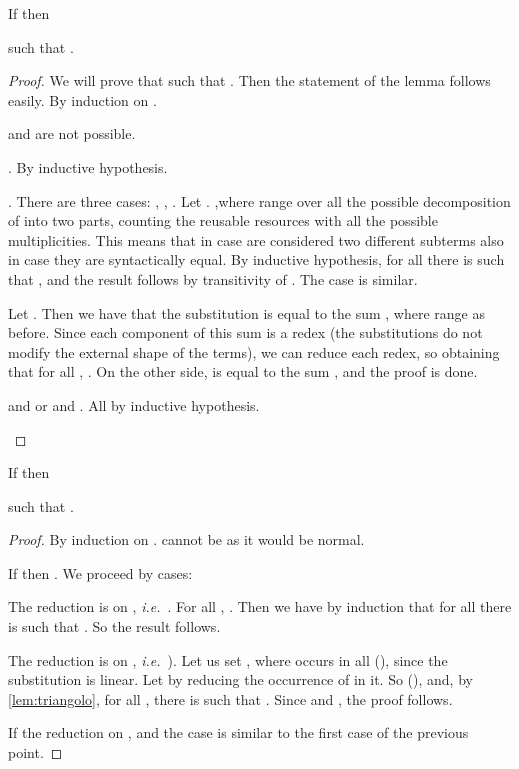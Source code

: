 \begin{lemma} \label{lem:triangolo}
If  then

such that .
\end{lemma}
\begin{proof}
We will prove that 
such that . Then the statement of the lemma follows easily.
By induction on . 
\begin{enumcases}
\item  and  are not possible.
\item .
By inductive hypothesis.
\item .
There are three cases: , ,
.
Let .
,where
 range over all the possible decomposition of  into two parts, counting the reusable resources
with all the possible multiplicities. This means that in case  are considered two different subterms also
in case they are syntactically equal.
By inductive hypothesis, for all  there is
 such that , and the result follows by transitivity of .
The case  is similar.

Let .
Then we have that the substitution  is equal to the sum , where
 range as before. Since each component of this sum is a redex (the substitutions do not modify the
external shape of the terms), we can reduce each redex, so obtaining that for all
, .
On the other side,  is equal to the sum
, and the proof is done.



\item  and  or  and .
All by inductive hypothesis.\qedhere
\end{enumcases}


\end{proof}

\begin{lemma} \label{lem:quadrato}
If  then

such that .
\end{lemma}

\begin{proof}
By induction on .  cannot be  as it would be normal.

If  then
.
We proceed by cases:
\begin{enumcases}
\item The reduction is on , \emph{i.e.}\ .
For all , . Then we have by induction that
for all  there is  such that .
So the result follows.

\item The reduction is on , \emph{i.e.}\ ).
Let us set ,
where  occurs in all  (), since the substitution is linear.
Let  by reducing the occurrence of  in it.
So  (), and, by \autoref{lem:triangolo},
for all , there is 
such that . Since  and , the proof follows.\
\end{enumcases}

If 
the reduction on , and the case is similar to the first case of the previous point.\qedhere





\end{proof}

